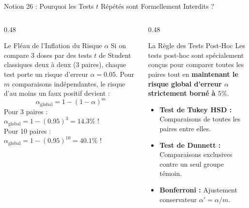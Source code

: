 \documentclass[aspectratio=169,10pt]{beamer}
\begin{document}
\begin{frame}{Notion 26 : Pourquoi les Tests $t$ Répétés sont Formellement Interdits ?}
  \begin{columns}[onlytextwidth, T]
    \begin{column}{0.48\linewidth}
      \begin{warnbox}{Le Fléau de l'Inflation du Risque $\alpha$}
        Si on compare 3 doses par des tests $t$ de Student classiques deux à deux (3 paires), chaque test porte un risque d'erreur $\alpha = 0.05$.
        Pour $m$ comparaisons indépendantes, le risque d'au moins un faux positif devient :
        \begin{equation*}
          \alpha_{\text{global}} = 1 - (1 - \alpha)^m
        \end{equation*}
        Pour 3 paires : $\alpha_{\text{global}} = 1 - (0.95)^3 = \mathbf{14.3\%}$ !\\
        Pour 10 paires : $\alpha_{\text{global}} = 1 - (0.95)^{10} = \mathbf{40.1\%}$ !
      \end{warnbox}
    \end{column}
    \begin{column}{0.48\linewidth}
      \begin{conceptbox}{La Règle des Tests Post-Hoc}
        Les tests post-hoc sont spécialement conçus pour comparer toutes les paires tout en \textbf{maintenant le risque global d'erreur $\alpha$ strictement borné à $5\%$}.
        \begin{itemize}
          \item \textbf{Test de Tukey HSD :} Comparaisons de toutes les paires entre elles.
          \item \textbf{Test de Dunnett :} Comparaisons exclusives contre un seul groupe témoin.
          \item \textbf{Bonferroni :} Ajustement conservateur $\alpha' = \alpha / m$.
        \end{itemize}
      \end{conceptbox}
    \end{column}
  \end{columns}
\end{frame}
\end{document}
